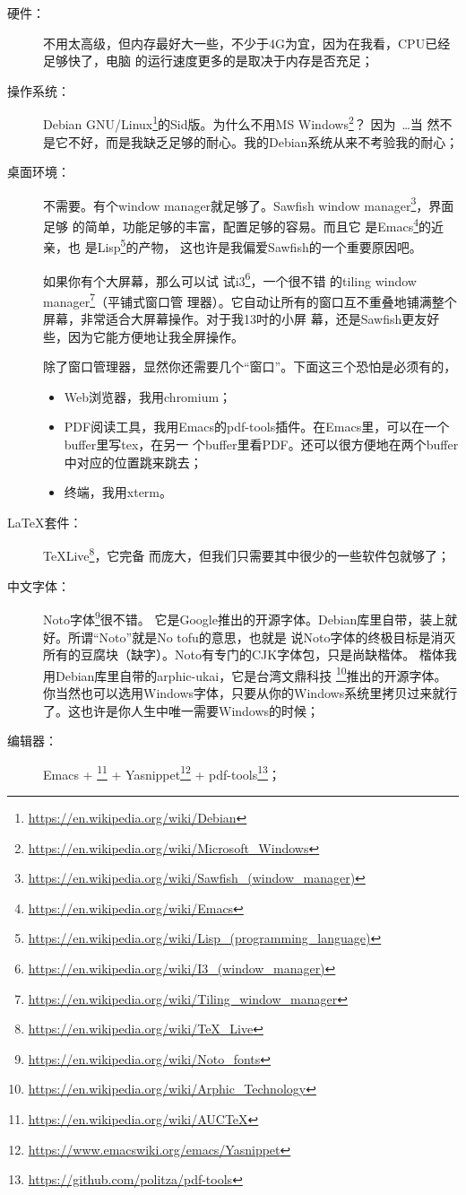 \documentclass{swfcthesis}
\begin{document}
\begin{description}
\item[硬件：]不用太高级，但内存最好大一些，不少于4G为宜，因为在我看，CPU已经足够快了，电脑
  的运行速度更多的是取决于内存是否充足；
\item[操作系统：]Debian
  GNU/Linux\footnote{\url{https://en.wikipedia.org/wiki/Debian}}的Sid版。为什么不用MS
  Windows\footnote{\url{https://en.wikipedia.org/wiki/Microsoft_Windows}}？ 因为~\ldots 当
  然不是它不好，而是我缺乏足够的耐心。我的Debian系统从来不考验我的耐心；
\item[桌面环境：]不需要。有个window manager就足够了。Sawfish window
  manager\footnote{\url{https://en.wikipedia.org/wiki/Sawfish_(window_manager)}}，界面足够
  的简单，功能足够的丰富，配置足够的容易。而且它
  是Emacs\footnote{\url{https://en.wikipedia.org/wiki/Emacs}}的近亲，也
  是Lisp\footnote{\url{https://en.wikipedia.org/wiki/Lisp_(programming_language)}}的产物，
  这也许是我偏爱Sawfish的一个重要原因吧。

  如果你有个大屏幕，那么可以试
  试i3\footnote{\url{https://en.wikipedia.org/wiki/I3_(window_manager)}}，一个很不错
  的tiling window
  manager\footnote{\url{https://en.wikipedia.org/wiki/Tiling_window_manager}}（平铺式窗口管
  理器）。它自动让所有的窗口互不重叠地铺满整个屏幕，非常适合大屏幕操作。对于我13吋的小屏
  幕，还是Sawfish更友好些，因为它能方便地让我全屏操作。

  除了窗口管理器，显然你还需要几个“窗口”。下面这三个恐怕是必须有的，

  \begin{itemize}
  \item Web浏览器，我用chromium；
  \item PDF阅读工具，我用Emacs的pdf-tools插件。在Emacs里，可以在一个buffer里写tex，在另一
    个buffer里看PDF。还可以很方便地在两个buffer中对应的位置跳来跳去；
  \item 终端，我用xterm。
  \end{itemize}

\item[\LaTeX{}套件：]TeXLive\footnote{\url{https://en.wikipedia.org/wiki/TeX_Live}}，它完备
  而庞大，但我们只需要其中很少的一些软件包就够了；
\item[中文字体：]Noto字体\footnote{\url{https://en.wikipedia.org/wiki/Noto_fonts}}很不错。
  它是Google推出的开源字体。Debian库里自带，装上就好。所谓“Noto”就是No tofu的意思，也就是
  说Noto字体的终极目标是消灭所有的豆腐块（缺字）。Noto有专门的CJK字体包，只是尚缺楷体。%
  楷体我用Debian库里自带的arphic-ukai，它是台湾文鼎科技%
  \footnote{\url{https://en.wikipedia.org/wiki/Arphic_Technology}}推出的开源字体。
  你当然也可以选用Windows字体，只要从你的Windows系统里拷贝过来就行了。这也许是你人生中唯一需要Windows的时候；
\item[编辑器：]Emacs + \auctex\footnote{\url{https://en.wikipedia.org/wiki/AUCTeX}} +
  Yasnippet\footnote{\url{https://www.emacswiki.org/emacs/Yasnippet}} +
  pdf-tools\footnote{\url{https://github.com/politza/pdf-tools}}；


\end{description}
\end{document}
